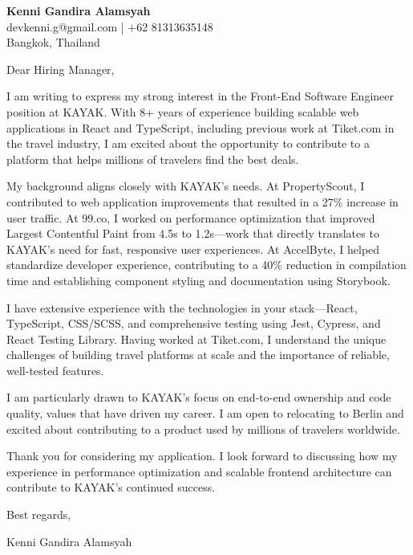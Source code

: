 \documentclass[11pt,a4paper]{letter}
\begin{document}
\begin{flushleft}
\textbf{Kenni Gandira Alamsyah} \\
devkenni.g@gmail.com | +62 81313635148 \\
Bangkok, Thailand
\end{flushleft}

\vspace{1em}

Dear Hiring Manager,

I am writing to express my strong interest in the Front-End Software Engineer position at KAYAK. With 8+ years of experience building scalable web applications in React and TypeScript, including previous work at Tiket.com in the travel industry, I am excited about the opportunity to contribute to a platform that helps millions of travelers find the best deals.

My background aligns closely with KAYAK's needs. At PropertyScout, I contributed to web application improvements that resulted in a 27\% increase in user traffic. At 99.co, I worked on performance optimization that improved Largest Contentful Paint from 4.5s to 1.2s—work that directly translates to KAYAK's need for fast, responsive user experiences. At AccelByte, I helped standardize developer experience, contributing to a 40\% reduction in compilation time and establishing component styling and documentation using Storybook.

I have extensive experience with the technologies in your stack—React, TypeScript, CSS/SCSS, and comprehensive testing using Jest, Cypress, and React Testing Library. Having worked at Tiket.com, I understand the unique challenges of building travel platforms at scale and the importance of reliable, well-tested features.

I am particularly drawn to KAYAK's focus on end-to-end ownership and code quality, values that have driven my career. I am open to relocating to Berlin and excited about contributing to a product used by millions of travelers worldwide.

Thank you for considering my application. I look forward to discussing how my experience in performance optimization and scalable frontend architecture can contribute to KAYAK's continued success.

\vspace{1em}

Best regards,

Kenni Gandira Alamsyah
\end{document}
